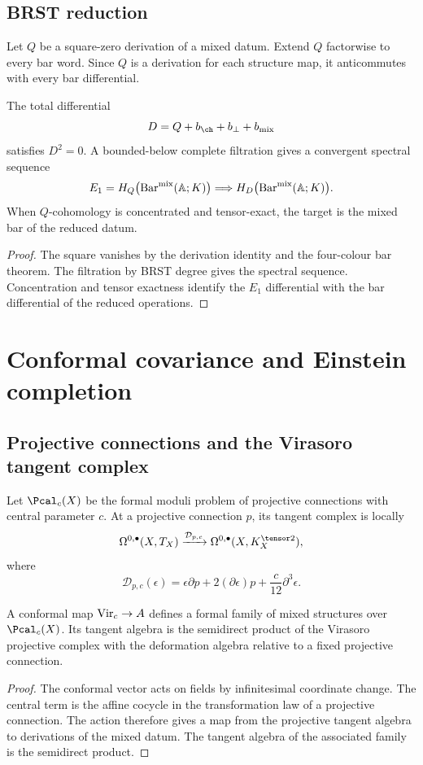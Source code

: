 \chapter{BRST reduction}
Let $Q$ be a square-zero derivation of a mixed datum.  Extend $Q$ factorwise to every bar word.  Since $Q$ is a derivation for each structure map, it anticommutes with every bar differential.

\begin{theorem}
The total differential
\[
 D=Q+b_{\ch}+b_\perp+b_{\mathrm{mix}}
\]
satisfies $D^2=0$.  A bounded-below complete filtration gives a convergent spectral sequence
\[
 E_1=H_Q\bigl(\operatorname{Bar}^{\mathrm{mix}}(\mathbb A;K)\bigr)
 \Longrightarrow H_D\bigl(\operatorname{Bar}^{\mathrm{mix}}(\mathbb A;K)\bigr).
\]
When $Q$-cohomology is concentrated and tensor-exact, the target is the mixed bar of the reduced datum.
\end{theorem}
\begin{proof}
The square vanishes by the derivation identity and the four-colour bar theorem.  The filtration by BRST degree gives the spectral sequence.  Concentration and tensor exactness identify the $E_1$ differential with the bar differential of the reduced operations.
\end{proof}

\part{Conformal covariance and Einstein completion}

\chapter{Projective connections and the Virasoro tangent complex}
Let $\Pcal_c(X)$ be the formal moduli problem of projective connections with central parameter $c$.  At a projective connection $p$, its tangent complex is locally
\[
 \Omega^{0,\bullet}(X,T_X)
 \xrightarrow{\mathcal D_{p,c}}
 \Omega^{0,\bullet}(X,K_X^{\tensor2}),
\]
where
\[
 \mathcal D_{p,c}(\epsilon)
 =\epsilon\partial p+2(\partial\epsilon)p+\frac{c}{12}\partial^3\epsilon.
\]

\begin{theorem}
A conformal map $\operatorname{Vir}_c\to A$ defines a formal family of mixed structures over $\Pcal_c(X)$.  Its tangent algebra is the semidirect product of the Virasoro projective complex with the deformation algebra relative to a fixed projective connection.
\end{theorem}
\begin{proof}
The conformal vector acts on fields by infinitesimal coordinate change.  The central term is the affine cocycle in the transformation law of a projective connection.  The action therefore gives a map from the projective tangent algebra to derivations of the mixed datum.  The tangent algebra of the associated family is the semidirect product.
\end{proof}


